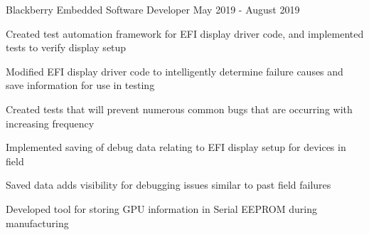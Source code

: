 

\begin{cventries}

  \cventry
    {Blackberry} %
    {Embedded Software Developer} %
    {May 2019 - August 2019} %
    {}
    {
      \begin{cvitems} %
        \item {Created test automation framework for EFI display driver code, and implemented tests to verify display setup}
        \item {Modified EFI display driver code to intelligently determine failure causes and save information for use in testing}
        \item {Created tests that will prevent numerous common bugs that are occurring with increasing frequency}
        \item {Implemented saving of debug data relating to EFI display setup for devices in field}
        \item {Saved data adds visibility for debugging issues similar to past field failures}
        \item {Developed tool for storing GPU information in Serial EEPROM during manufacturing}
      \end{cvitems}
    }


\end{cventries}
